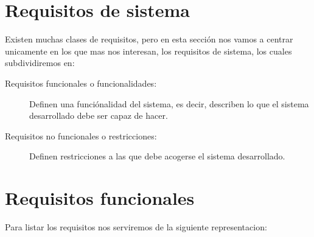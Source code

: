 \section{Requisitos de sistema}

    Existen muchas clases de requisitos, pero en esta sección nos vamos a centrar unicamente en los que mas nos interesan, los requisitos de sistema, los cuales subdividiremos en:
    \begin{description}
        \item[Requisitos funcionales o funcionalidades:]
            Definen una funciónalidad del sistema, es decir, describen lo que el sistema desarrollado debe ser capaz de hacer.
        \item[Requisitos no funcionales o restricciones:]
            Definen restricciones a las que debe acogerse el sistema desarrollado.
    \end{description}
  

\section{Requisitos funcionales}
    Para listar los requisitos nos serviremos de la siguiente representacion:
    
    
    
    
    
    
    
    
    
    
    
    
    
    
    
    
    
    
    
    
    
    
    
    
    
    
    
    
    
    
    
    
     
